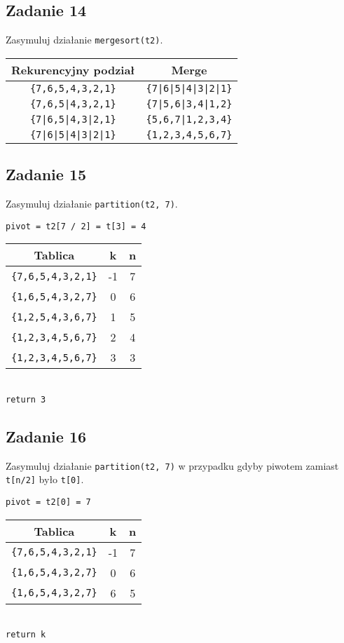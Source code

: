 \documentclass{article}
\begin{document}
\subsection*{Zadanie 14}
Zasymuluj działanie \verb+mergesort(t2)+.
\begin{center}
    \begin{tabular}{c c}
        \textbf{Rekurencyjny podział} & \textbf{Merge}         \\
        \hline
        \verb+{7,6,5,4,3,2,1}+        & \verb+{7|6|5|4|3|2|1}+ \\
        \verb+{7,6,5|4,3,2,1}+        & \verb+{7|5,6|3,4|1,2}+ \\
        \verb+{7|6,5|4,3|2,1}+        & \verb+{5,6,7|1,2,3,4}+ \\
        \verb+{7|6|5|4|3|2|1}+        & \verb+{1,2,3,4,5,6,7}+
    \end{tabular}
\end{center}

\subsection*{Zadanie 15}
Zasymuluj działanie \verb+partition(t2, 7)+.
\begin{center}
    \verb+pivot = t2[7 / 2] = t[3] = 4+ \\
    \begin{tabular}{c c c}
        \textbf{Tablica}       & \textbf{k} & \textbf{n} \\
        \hline
        \verb+{7,6,5,4,3,2,1}+ & -1         & 7          \\
        \verb+{1,6,5,4,3,2,7}+ & 0          & 6          \\
        \verb+{1,2,5,4,3,6,7}+ & 1          & 5          \\
        \verb+{1,2,3,4,5,6,7}+ & 2          & 4          \\
        \verb+{1,2,3,4,5,6,7}+ & 3          & 3          \\
    \end{tabular} \\
    \verb+return 3+
\end{center}

\subsection*{Zadanie 16}
Zasymuluj działanie \verb+partition(t2, 7)+ w przypadku gdyby piwotem zamiast \verb+t[n/2]+ było \verb+t[0]+.
\begin{center}
    \verb+pivot = t2[0] = 7+ \\
    \begin{tabular}{c c c}
        \textbf{Tablica}       & \textbf{k} & \textbf{n} \\
        \hline
        \verb+{7,6,5,4,3,2,1}+ & -1         & 7          \\
        \verb+{1,6,5,4,3,2,7}+ & 0          & 6          \\
        \verb+{1,6,5,4,3,2,7}+ & 6          & 5          \\
    \end{tabular} \\
    \verb+return k+
\end{center}
\end{document}
